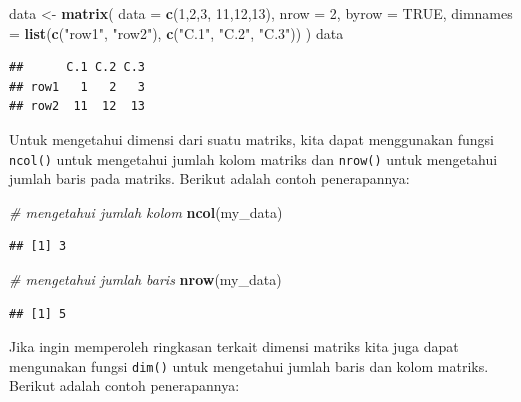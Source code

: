 \documentclass[]{book}
\newenvironment{Shaded}{\begin{snugshade}}{\end{snugshade}}
\newcommand{\KeywordTok}[1]{\textcolor[rgb]{0.13,0.29,0.53}{\textbf{#1}}}
\newcommand{\DataTypeTok}[1]{\textcolor[rgb]{0.13,0.29,0.53}{#1}}
\newcommand{\DecValTok}[1]{\textcolor[rgb]{0.00,0.00,0.81}{#1}}
\newcommand{\StringTok}[1]{\textcolor[rgb]{0.31,0.60,0.02}{#1}}
\newcommand{\CommentTok}[1]{\textcolor[rgb]{0.56,0.35,0.01}{\textit{#1}}}
\newcommand{\OtherTok}[1]{\textcolor[rgb]{0.56,0.35,0.01}{#1}}
\newcommand{\NormalTok}[1]{#1}
\begin{document}
\begin{Shaded}
\begin{Highlighting}[]
\NormalTok{data <-}\StringTok{ }\KeywordTok{matrix}\NormalTok{(}
           \DataTypeTok{data =} \KeywordTok{c}\NormalTok{(}\DecValTok{1}\NormalTok{,}\DecValTok{2}\NormalTok{,}\DecValTok{3}\NormalTok{, }\DecValTok{11}\NormalTok{,}\DecValTok{12}\NormalTok{,}\DecValTok{13}\NormalTok{), }
           \DataTypeTok{nrow =} \DecValTok{2}\NormalTok{, }\DataTypeTok{byrow =} \OtherTok{TRUE}\NormalTok{,}
           \DataTypeTok{dimnames =} \KeywordTok{list}\NormalTok{(}\KeywordTok{c}\NormalTok{(}\StringTok{"row1"}\NormalTok{, }\StringTok{"row2"}\NormalTok{), }\KeywordTok{c}\NormalTok{(}\StringTok{"C.1"}\NormalTok{, }\StringTok{"C.2"}\NormalTok{, }\StringTok{"C.3"}\NormalTok{))}
\NormalTok{           )}
\NormalTok{data}
\end{Highlighting}
\end{Shaded}

\begin{verbatim}
##      C.1 C.2 C.3
## row1   1   2   3
## row2  11  12  13
\end{verbatim}

Untuk mengetahui dimensi dari suatu matriks, kita dapat menggunakan
fungsi \texttt{ncol()} untuk mengetahui jumlah kolom matriks dan
\texttt{nrow()} untuk mengetahui jumlah baris pada matriks. Berikut
adalah contoh penerapannya:

\begin{Shaded}
\begin{Highlighting}[]
\CommentTok{# mengetahui jumlah kolom}
\KeywordTok{ncol}\NormalTok{(my_data)}
\end{Highlighting}
\end{Shaded}

\begin{verbatim}
## [1] 3
\end{verbatim}

\begin{Shaded}
\begin{Highlighting}[]
\CommentTok{# mengetahui jumlah baris}
\KeywordTok{nrow}\NormalTok{(my_data)}
\end{Highlighting}
\end{Shaded}

\begin{verbatim}
## [1] 5
\end{verbatim}

Jika ingin memperoleh ringkasan terkait dimensi matriks kita juga dapat
mengunakan fungsi \texttt{dim()} untuk mengetahui jumlah baris dan kolom
matriks. Berikut adalah contoh penerapannya:
\end{document}
